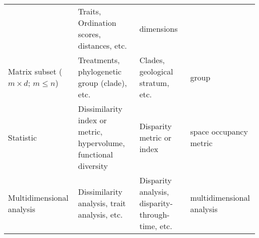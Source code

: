 \documentclass[]{article}
\begin{document}
\begin{longtable}[]{@{}llll@{}}
\begin{minipage}[t]{0.16\columnwidth}
\end{minipage} & \begin{minipage}[t]{0.25\columnwidth}\raggedright\strut
Traits, Ordination scores, distances, etc.\strut
\end{minipage} & \begin{minipage}[t]{0.20\columnwidth}\raggedright\strut
dimensions\strut
\end{minipage}\tabularnewline
\begin{minipage}[t]{0.20\columnwidth}\raggedright\strut
Matrix subset (\(m \times d\); \(m \leq n\))\strut
\end{minipage} & \begin{minipage}[t]{0.16\columnwidth}\raggedright\strut
Treatments, phylogenetic group (clade), etc.\strut
\end{minipage} & \begin{minipage}[t]{0.25\columnwidth}\raggedright\strut
Clades, geological stratum, etc.\strut
\end{minipage} & \begin{minipage}[t]{0.20\columnwidth}\raggedright\strut
group\strut
\end{minipage}\tabularnewline
\begin{minipage}[t]{0.20\columnwidth}\raggedright\strut
Statistic\strut
\end{minipage} & \begin{minipage}[t]{0.16\columnwidth}\raggedright\strut
Dissimilarity index or metric, hypervolume, functional diversity\strut
\end{minipage} & \begin{minipage}[t]{0.25\columnwidth}\raggedright\strut
Disparity metric or index\strut
\end{minipage} & \begin{minipage}[t]{0.20\columnwidth}\raggedright\strut
space occupancy metric\strut
\end{minipage}\tabularnewline
\begin{minipage}[t]{0.20\columnwidth}\raggedright\strut
Multidimensional analysis\strut
\end{minipage} & \begin{minipage}[t]{0.16\columnwidth}\raggedright\strut
Dissimilarity analysis, trait analysis, etc.\strut
\end{minipage} & \begin{minipage}[t]{0.25\columnwidth}\raggedright\strut
Disparity analysis, disparity-through-time, etc.\strut
\end{minipage} & \begin{minipage}[t]{0.20\columnwidth}\raggedright\strut
multidimensional analysis\strut
\end{minipage}\tabularnewline
\bottomrule
\end{longtable}
\end{document}
